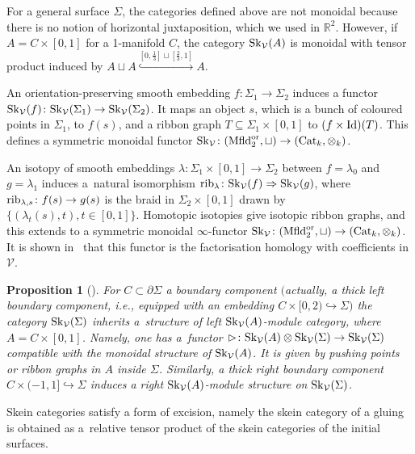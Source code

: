 \documentclass[pdftex]{sigma}%
\numberwithin{equation}{section}
\newtheorem{Proposition}[Theorem]{Proposition}
 { \theoremstyle{definition}
\newtheorem{Definition}[Theorem]{Definition}
\newtheorem{Note}[Theorem]{Note}
\newtheorem{Example}[Theorem]{Example}
\newtheorem{Remark}[Theorem]{Remark} }
\begin{document}
\begin{Remark}\label{Skmonoidal}
For a general surface $\Sigma$, the categories defined above are not monoidal because there is no notion of horizontal juxtaposition, which we used in $\mathbb{R}^2$. However, if $A = C \times [0,1]$ for a 1-manifold $C$, the category ${\rm Sk}_\mathcal{V}(A)$ is monoidal with tensor product induced by $A \sqcup A \overset{[0,\frac{1}{3}]\sqcup[\frac{2}{3},1]}\hookrightarrow A$.
\end{Remark}

\begin{Remark}\label{rmkFunctEmbIsotOfSkCat} An orientation-preserving smooth embedding $f\colon\Sigma_1 \allowbreak\to \Sigma_2$ induces a functor ${\rm Sk}_\mathcal{V}(f)\colon{\rm Sk}_\mathcal{V}(\Sigma_1)\to {\rm Sk}_\mathcal{V}(\Sigma_2)$. It maps an object $s$, which is a bunch of coloured points in $\Sigma_1$, to $f(s)$, and a ribbon graph $T \subseteq \Sigma_1 \times [0,1]$ to $(f\times {\rm Id})(T)$. This defines a symmetric monoidal functor ${\rm Sk}_\mathcal{V}\colon ({\rm Mfld}_2^{\rm or},\sqcup) \to ({\rm Cat}_k,\otimes_k)$.

An isotopy of smooth embeddings $\lambda \colon \Sigma_1 \times [0,1] \to \Sigma_2$ between $f=\lambda_0$ and $g=\lambda_1$ induces a~natural isomorphism ${\rm rib}_\lambda\colon {\rm Sk}_\mathcal{V}(f) \Rightarrow {\rm Sk}_\mathcal{V}(g)$, where ${\rm rib}_{\lambda,s}\colon f(s) \to g(s)$ is the braid in $\Sigma_2 \times [0,1]$ drawn by $\{(\lambda_t(s),t), t \in [0,1]\}$. Homotopic isotopies give isotopic ribbon graphs, and this extends to a symmetric monoidal $\infty$-functor ${\rm Sk}_\mathcal{V}\colon ({\rm Mfld}_2^{\rm or},\sqcup) \to ({\rm Cat}_k,\otimes_k)$. It is shown in~\cite{Cooke} that this functor is the factorisation homology with coefficients in $\mathcal{V}$.
\end{Remark}

\begin{Proposition}[{\cite[Section~1.3]{Cooke}}]\label{Skmodcat}
For $C\subset \partial \Sigma$ a boundary component $($actually, a thick left boundary component, i.e., equipped with an embedding $C \times [0,2) \hookrightarrow \Sigma)$ the category ${\rm Sk}_\mathcal{V}(\Sigma)$ inherits a~structure of left ${\rm Sk}_\mathcal{V}(A)$-module category, where $A = C\times [0,1]$. Namely, one has a~functor $\rhd\colon {\rm Sk}_\mathcal{V}(A) \otimes {\rm Sk}_\mathcal{V}(\Sigma) \to {\rm Sk}_\mathcal{V}(\Sigma)$ compatible with the monoidal structure of ${\rm Sk}_\mathcal{V}(A)$. It is given by pushing points or ribbon graphs in $A$ inside $\Sigma$.
Similarly, a thick right boundary component $C\times (-1,1]\hookrightarrow \Sigma$ induces a right ${\rm Sk}_\mathcal{V}(A)$-module structure on ${\rm Sk}_\mathcal{V}(\Sigma)$.
\end{Proposition}
Skein categories satisfy a form of excision, namely the skein category of a gluing is obtained as a~relative tensor product of the skein categories of the initial surfaces.
\end{document}
